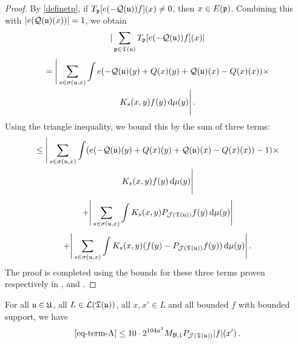 \begin{proof}
    \leanok
    By \eqref{definetp}, if $T_{{\mathfrak p}}[ e(-{\mathcal{Q}}({\mathfrak u}))f](x) \ne 0$, then $x \in E({\mathfrak p})$. Combining this with $|e({\mathcal{Q}}({\mathfrak u})(x))| = 1$, we obtain
    $$
        |\sum_{{\mathfrak p} \in {\mathfrak T}({\mathfrak u})} T_{{\mathfrak p}}[ e(-{\mathcal{Q}}({\mathfrak u}))f](x)|
    $$
    \begin{multline*}
        = \Bigg| \sum_{s \in \sigma({\mathfrak u}, x)} \int e(-{\mathcal{Q}}({\mathfrak u})(y) + {Q}(x)(y) + {\mathcal{Q}}({\mathfrak u})(x) -{Q}(x)(x))\times\\
        K_s(x,y)f(y) \, \mathrm{d}\mu(y) \Bigg|\,.
    \end{multline*}
    Using the triangle inequality, we bound this by the sum of three terms:
    \begin{multline}
        \label{eq-term-A}
        \le \Bigg| \sum_{s \in \sigma({\mathfrak u}, x)} \int (e(-{\mathcal{Q}}({\mathfrak u})(y) + {Q}(x)(y) + {\mathcal{Q}}({\mathfrak u})(x) -{Q}(x)(x))-1)\times\\
        K_s(x,y)f(y) \, \mathrm{d}\mu(y) \Bigg|
    \end{multline}
    \begin{equation}
        \label{eq-term-B}
        + \Bigg| \sum_{s \in \sigma({\mathfrak u}, x)} \int K_s(x,y) P_{\mathcal{J}({\mathfrak T}({\mathfrak u}))} f(y) \, \mathrm{d}\mu(y) \Bigg|
    \end{equation}
    \begin{equation}
        \label{eq-term-C}
        + \Bigg| \sum_{s \in \sigma({\mathfrak u}, x)} \int K_s(x,y) (f(y) - P_{\mathcal{J}({\mathfrak T}({\mathfrak u}))} f(y)) \, \mathrm{d}\mu(y) \Bigg|\,.
    \end{equation}
    The proof is completed using the bounds for these three terms proven respectively in ,  and .
\end{proof}

\begin{lemma}
    \label{first-tree-pointwise}
    \leanok
    For all ${\mathfrak u} \in {\mathfrak U}$, all $L \in \mathcal{L}({\mathfrak T}({\mathfrak u}))$, all $x, x' \in L$ and all bounded $f$ with bounded support, we have
    $$
        \eqref{eq-term-A} \le 10 \cdot 2^{104a^3} M_{\mathcal{B}, 1}P_{\mathcal{J}({\mathfrak T}({\mathfrak u}))}|f|(x')\,.
    $$
\end{lemma}

